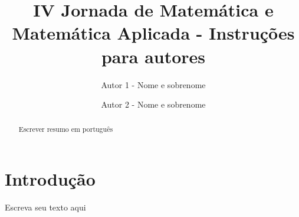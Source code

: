 \documentclass[a4paper, twoside]{article}
\title{IV Jornada de Matemática e Matemática Aplicada - Instruções para autores}
\author[1]{Autor 1 - Nome e sobrenome}
\author[2]{Autor 2 - Nome e sobrenome}
\affil[1]{Afiliação autor 1}
\affil[2]{Afiliação autor 2}
\date{}
\begin{document}
\maketitle
\thispagestyle{firstpage}
    
\renewcommand{\abstractname}{Resumo}
\begin{abstract}
Escrever resumo em português
\end{abstract}

\section{Introdução}


Escreva seu texto aqui

\newpage


\renewcommand{\refname}{Referências Bibliográficas}


\end{document}
